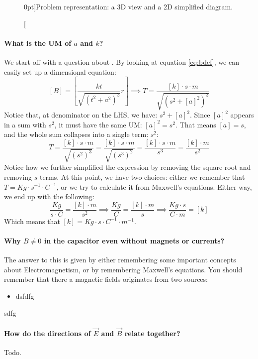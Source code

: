 \begin{figure}
    \centering
    
    \caption[Problem representation.][0pt]{Problem representation: a 3D view and a 2D
    simplified diagram.}
    \label{fig:capacitorovervw}
\end{figure}

\paragraph{What is the UM of $a$ and $k$?}
We start off with a question
about . By looking at equation \ref{eq:bdef}, we can
easily set up a dimensional equation:
\begin{equation*}
    \left[ B \right] = \left[ \frac{k t}{\sqrt{\left( t^2 + a^2 \right)^3}} r \right] \implies
    \unit{T} = \frac{[k] \cdot \unit{s} \cdot \unit{m}}{\sqrt{\left( \unit{s}^2 + [a]^2 \right)^3}}
\end{equation*}
Notice that, at denominator on the LHS, we have: $s^2 + [a]^2$. Since $[a]^2$
appears in a sum with $s^2$, it must have the same UM: $[a]^2 = s^2$.
That means $[a] = \unit{s}$, and the whole sum collapses into a single term: $s^2$:
\begin{equation*}
    \unit{T} = \frac{[k] \cdot \unit{s} \cdot \unit{m}}{\sqrt{\left( \unit{s}^2 \right)^3}} = 
    \frac{[k] \cdot \unit{s} \cdot \unit{m}}{\sqrt{\left( \unit{s}^3 \right)^2}} = 
    \frac{[k] \cdot \unit{s} \cdot \unit{m}}{\unit{s}^3} =
    \frac{[k] \cdot \unit{m}}{\unit{s}^2}
\end{equation*}
Notice how we further simplified the expression by removing the square root and removing
$\unit{s}$ terms. At this point, we have two choices: either we remember that
$T=\unit{Kg} \cdot \unit{s}^{-1} \cdot \unit{C}^{-1}$, or we try to calculate it from
Maxwell's equations. Either way, we end up with the following:
\begin{equation*}
    \frac{\unit{Kg}}{\unit{s} \cdot \unit{C}} = \frac{[k] \cdot \unit{m}}{\unit{s}^2} \implies
    \frac{\unit{Kg}}{\unit{C}} = \frac{[k] \cdot \unit{m}}{\unit{s}} \implies
    \frac{\unit{Kg} \cdot \unit{s}}{\unit{C} \cdot \unit{m}} = [k]
\end{equation*}
Which means that $[k] = \unit{Kg} \cdot \unit{s} \cdot \unit{C}^{-1} \cdot \unit{m}^{-1}$.

\paragraph{Why $B \neq 0$ in the capacitor even without magnets or currents?}
The answer to this
is given by either remembering some important concepts about Electromagnetism, or by
remembering Maxwell's equations. You should remember that there a magnetic fields originates
from two sources:
\begin{itemize}
    \item dsfdfg
\end{itemize}
sdfg

\paragraph{How do the directions of $\vec{E}$ and $\vec{B}$ relate together?} Todo.
